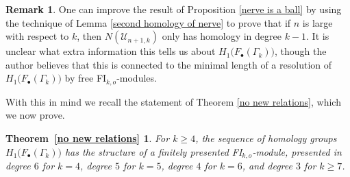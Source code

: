 \documentclass[pagebackref,colorlinks,citecolor=blue,linkcolor=blue,urlcolor=blue,filecolor=blue]{article}
\newtheorem*{T2}{Theorem~\ref{no new relations}}
\theoremstyle{definition}\newtheorem{definition}[thm]{Definition}
\theoremstyle{definition}
\newtheorem{remark}[thm]{Remark}
\newcommand{\thmtextone}{For $k\ge 4$, the sequence of homology groups $H_{1}\big(F_{\bullet}(\Gamma_{k})\big)$ has the structure of a finitely presented FI$_{k,o}$-module, presented in degree $6$ for $k=4$, degree $5$ for $k=5$, degree $4$ for $k=6$, and degree $3$ for $k\ge 7$.}
\begin{document}
\begin{remark}\label{wedge of spheres}
One can improve the result of Proposition \ref{nerve is a ball} by using the technique of Lemma \ref{second homology of nerve} to prove that if $n$ is large with respect to $k$, then $N(\mathcal{U}_{n+1, k})$ only has homology in degree $k-1$.
It is unclear what extra information this tells us about $H_{1}\big(F_{\bullet}(\Gamma_{k})\big)$, though the author believes that this is connected to the minimal length of a resolution of $H_{1}\big(F_{\bullet}(\Gamma_{k})\big)$ by free FI$_{k, o}$-modules.
\end{remark}

With this in mind we recall the statement of Theorem \ref{no new relations}, which we now prove.

\begin{T2}
  \thmtextone
\end{T2} 
\end{document}
